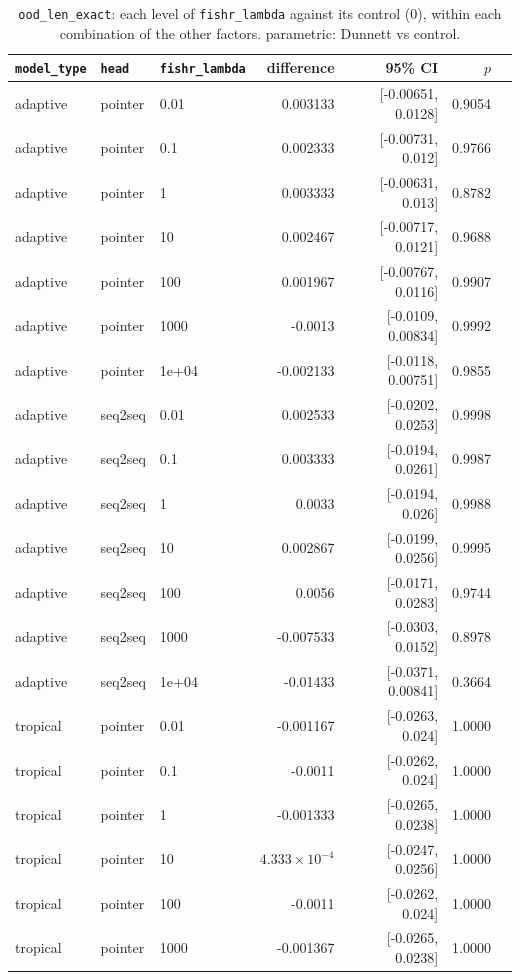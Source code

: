 \documentclass[10pt]{article}
\begin{document}
{\small
\begin{longtable}{lllrrrl}
\caption{\texttt{ood\_len\_exact}: each level of \texttt{fishr\_lambda} against its control (0), within each combination of the other factors. parametric: Dunnett vs control.}\label{tab:control-ood_len_exact}\\
\toprule
\texttt{model\_type} & \texttt{head} & \texttt{fishr\_lambda} & difference & 95\% CI & $p$ & \\
\midrule
\endhead
adaptive & pointer & 0.01 & 0.003133 & [-0.00651, 0.0128] & 0.9054 & \\
adaptive & pointer & 0.1 & 0.002333 & [-0.00731, 0.012] & 0.9766 & \\
adaptive & pointer & 1 & 0.003333 & [-0.00631, 0.013] & 0.8782 & \\
adaptive & pointer & 10 & 0.002467 & [-0.00717, 0.0121] & 0.9688 & \\
adaptive & pointer & 100 & 0.001967 & [-0.00767, 0.0116] & 0.9907 & \\
adaptive & pointer & 1000 & -0.0013 & [-0.0109, 0.00834] & 0.9992 & \\
adaptive & pointer & 1e+04 & -0.002133 & [-0.0118, 0.00751] & 0.9855 & \\
adaptive & seq2seq & 0.01 & 0.002533 & [-0.0202, 0.0253] & 0.9998 & \\
adaptive & seq2seq & 0.1 & 0.003333 & [-0.0194, 0.0261] & 0.9987 & \\
adaptive & seq2seq & 1 & 0.0033 & [-0.0194, 0.026] & 0.9988 & \\
adaptive & seq2seq & 10 & 0.002867 & [-0.0199, 0.0256] & 0.9995 & \\
adaptive & seq2seq & 100 & 0.0056 & [-0.0171, 0.0283] & 0.9744 & \\
adaptive & seq2seq & 1000 & -0.007533 & [-0.0303, 0.0152] & 0.8978 & \\
adaptive & seq2seq & 1e+04 & -0.01433 & [-0.0371, 0.00841] & 0.3664 & \\
tropical & pointer & 0.01 & -0.001167 & [-0.0263, 0.024] & 1.0000 & \\
tropical & pointer & 0.1 & -0.0011 & [-0.0262, 0.024] & 1.0000 & \\
tropical & pointer & 1 & -0.001333 & [-0.0265, 0.0238] & 1.0000 & \\
tropical & pointer & 10 & $4.333\times10^{-4}$ & [-0.0247, 0.0256] & 1.0000 & \\
tropical & pointer & 100 & -0.0011 & [-0.0262, 0.024] & 1.0000 & \\
tropical & pointer & 1000 & -0.001367 & [-0.0265, 0.0238] & 1.0000 & \\

\end{longtable}}
\end{document}
